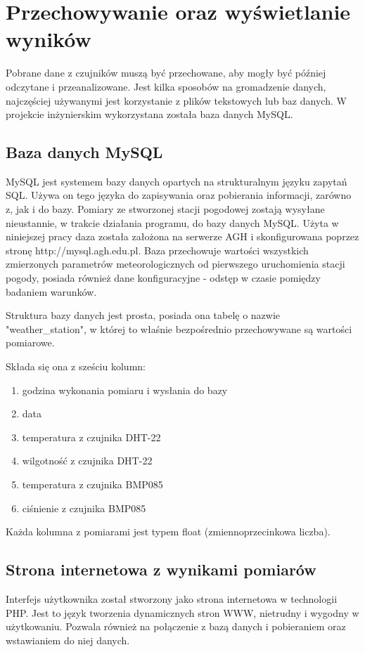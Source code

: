 \chapter{Przechowywanie oraz wyświetlanie wyników}

Pobrane dane z czujników muszą być przechowane, aby mogły być później odczytane i przeanalizowane. Jest kilka sposobów na gromadzenie danych, najczęściej używanymi jest korzystanie z plików tekstowych lub baz danych. W projekcie inżynierskim wykorzystana została baza danych MySQL. 

\section{Baza danych MySQL}
MySQL jest systemem bazy danych opartych na strukturalnym języku zapytań SQL. Używa on tego języka do zapisywania oraz pobierania informacji, zarówno z, jak i do bazy. 
Pomiary ze stworzonej stacji pogodowej zostają wysyłane nieustannie, w trakcie działania programu, do bazy danych MySQL. Użyta w niniejszej pracy daza została założona na serwerze AGH i skonfigurowana poprzez stronę http://mysql.agh.edu.pl. Baza przechowuje wartości wszystkich zmierzonych parametrów meteorologicznych od pierwszego uruchomienia stacji pogody, posiada również dane konfiguracyjne - odstęp w czasie pomiędzy badaniem warunków.

Struktura bazy danych jest prosta, posiada ona tabelę o nazwie "weather\_station", w której to właśnie bezpośrednio przechowywane są wartości pomiarowe.

Składa się ona z sześciu kolumn:
\begin{enumerate}
\setlength{\itemsep}{2pt} 
\setlength{\parskip}{2pt} 
\setlength{\parsep}{2pt}
\item godzina wykonania pomiaru i wysłania do bazy
\item data
\item temperatura z czujnika DHT-22
\item wilgotność z czujnika DHT-22
\item temperatura z czujnika BMP085
\item ciśnienie z czujnika BMP085
\end{enumerate}

Każda kolumna z pomiarami jest typem float (zmiennoprzecinkowa liczba).

\section{Strona internetowa z wynikami pomiarów}
Interfejs użytkownika został stworzony jako strona internetowa w technologii PHP. Jest to język tworzenia dynamicznych stron WWW, nietrudny i wygodny w użytkowaniu. Pozwala również na połączenie z bazą danych i pobieraniem oraz wstawianiem do niej danych.

